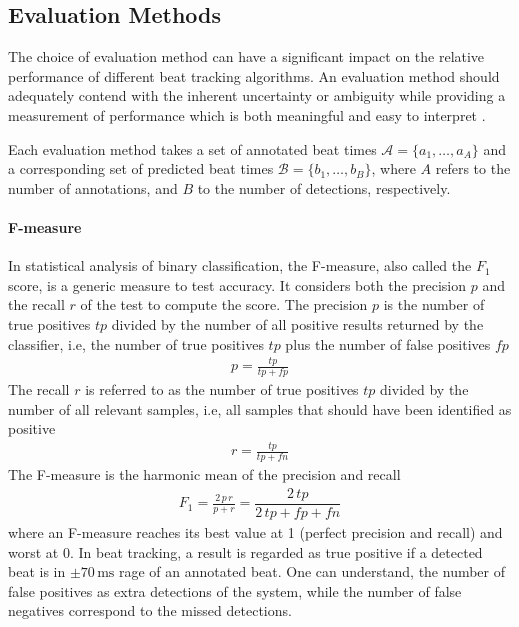\documentclass{scrartcl}
\begin{document}
\subsection{Evaluation Methods}

The choice of evaluation method can have a significant impact on the relative performance of different beat tracking algorithms. An evaluation method should adequately contend with the inherent uncertainty or ambiguity while providing a measurement of performance which is both meaningful and easy to interpret \cite{Davies2009b}. 

Each evaluation method takes a set of annotated beat times $\mathcal A = \{a_1, \dots, a_A\}$ and a corresponding set of predicted beat times $\mathcal B = \{b_1, \dots, b_B\}$, where $A$ refers to the number of annotations, and $B$ to the number of detections, respectively.


\paragraph{F-measure} 
In statistical analysis of binary classification, the F-measure, also called the $F_1$ score, is a generic measure to test accuracy. It considers both the precision $p$ and the recall $r$ of the test to compute the score. The precision $p$ is the number of true positives $tp$ divided by the number of all positive results returned by the classifier, i.e, the number of true positives $tp$ plus the number of false positives $fp$
\begin{align}
p = \frac{tp}{tp + fp}
\end{align} 
The recall $r$ is referred to as the number of true positives $tp$ divided by the number of all relevant samples, i.e, all samples that should have been identified as positive
\begin{align}
r = \frac{tp}{tp + fn}
\end{align} 
The F-measure is the harmonic mean of the precision and recall
\begin{align}
F_1=  \frac{2\,p\, r}{p +r} = \dfrac{2\, tp}{2\, tp + fp + fn}
\end{align} 
where an F-measure reaches its best value at 1 (perfect precision and recall) and worst at 0. In beat tracking, a result is regarded as true positive if a detected beat is in $\pm 70\,\text{ms}$ rage of an annotated beat. One can understand, the number of false positives as extra detections of the system, while the number of false negatives correspond to the missed detections.
\end{document}

